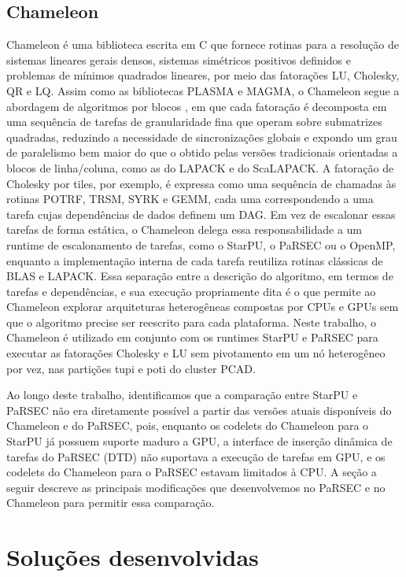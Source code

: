 \documentclass[12pt]{article}
\begin{document}
\subsection{Chameleon}

Chameleon \cite{AGULLO2012473} é uma biblioteca escrita em C que fornece rotinas para a resolução de sistemas lineares gerais densos, sistemas simétricos positivos definidos e problemas de mínimos quadrados lineares, por meio das fatorações LU, Cholesky, QR e LQ. Assim como as bibliotecas PLASMA e MAGMA, o Chameleon segue a abordagem de algoritmos por blocos \cite{DBLP}, em que cada fatoração é decomposta em uma sequência de tarefas de granularidade fina que operam sobre submatrizes quadradas, reduzindo a necessidade de sincronizações globais e expondo um grau de paralelismo bem maior do que o obtido pelas versões tradicionais orientadas a blocos de linha/coluna, como as do LAPACK e do ScaLAPACK. A fatoração de Cholesky por tiles, por exemplo, é expressa como uma sequência de chamadas às rotinas POTRF, TRSM, SYRK e GEMM, cada uma correspondendo a uma tarefa cujas dependências de dados definem um DAG. Em vez de escalonar essas tarefas de forma estática, o Chameleon delega essa responsabilidade a um runtime de escalonamento de tarefas, como o StarPU, o PaRSEC ou o OpenMP, enquanto a implementação interna de cada tarefa reutiliza rotinas clássicas de BLAS e LAPACK. Essa separação entre a descrição do algoritmo, em termos de tarefas e dependências, e sua execução propriamente dita é o que permite ao Chameleon explorar arquiteturas heterogêneas compostas por CPUs e GPUs sem que o algoritmo precise ser reescrito para cada plataforma. Neste trabalho, o Chameleon é utilizado em conjunto com os runtimes StarPU e PaRSEC para executar as fatorações Cholesky e LU sem pivotamento em um nó heterogêneo por vez, nas partições tupi e poti do cluster PCAD.

Ao longo deste trabalho, identificamos que a comparação entre StarPU e PaRSEC não era diretamente possível a partir das versões atuais disponíveis do Chameleon e do PaRSEC, pois, enquanto os codelets do Chameleon para o StarPU já possuem suporte maduro a GPU, a interface de inserção dinâmica de tarefas do PaRSEC (DTD) não suportava a execução de tarefas em GPU, e os codelets do Chameleon para o PaRSEC estavam limitados à CPU. A seção a seguir descreve as principais modificações que desenvolvemos no PaRSEC e no Chameleon para permitir essa comparação.

\section{Soluções desenvolvidas}
\end{document}
